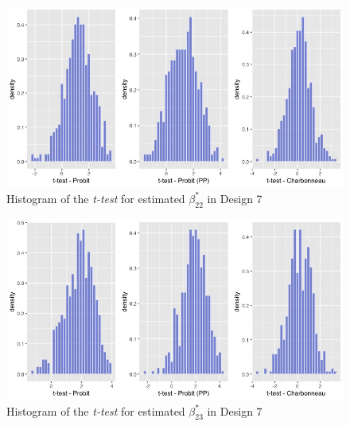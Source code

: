 \begin{figure}[htbp]
    \vspace{-2.5em}%
    \begin{adjustwidth}{-.5in}{-.5in}
    \centerline{\includegraphics[scale=.4]{content/Figures/ttest_beta22_Design7.png}}
    \caption{\footnotesize{Histogram of the \textit{t-test} for estimated $\beta_{22}^*$ in Design 7}}
    \label{ttest_beta22_Design7}
\end{adjustwidth}
\end{figure}
\begin{figure}[htbp]
    \vspace{-2.5em}%
    \begin{adjustwidth}{-.5in}{-.5in}
    \centerline{\includegraphics[scale=.4]{content/Figures/ttest_beta23_Design7.png}}
    \caption{\footnotesize{Histogram of the \textit{t-test} for estimated $\beta_{23}^*$ in Design 7}}
    \label{ttest_beta23_Design7}
\end{adjustwidth}
\end{figure}
